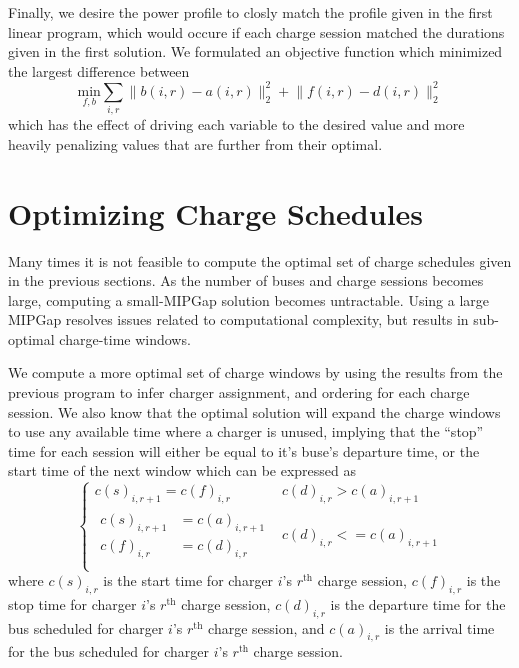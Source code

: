 \par Finally, we desire the power profile to closly match the profile given in the first linear program, which would occure if each charge session matched the durations given in the first solution. We formulated an objective function which minimized the largest difference between 
\begin{equation*}
	\underset{f,b}{\text{min}} \sum_{i,r}\lVert b(i,r) - a(i,r)\rVert_2^2 + \lVert f(i,r) - d(i,r) \rVert_2^2
\end{equation*}
which has the effect of driving each variable to the desired value and more heavily penalizing values that are further from their optimal.

\section{Optimizing Charge Schedules}
Many times it is not feasible to compute the optimal set of charge schedules given in the previous sections. As the number of buses and charge sessions becomes large, computing a small-MIPGap solution becomes untractable. Using a large MIPGap resolves issues related to computational complexity, but results in sub-optimal charge-time windows.
\par We compute a more optimal set of charge windows by using the results from the previous program to infer charger assignment, and ordering for each charge session. We also know that the optimal solution will expand the charge windows to use any available time where a charger is unused, implying that the ``stop'' time for each session will either be equal to it's buse's departure time, or the start time of the next window which can be expressed as
\begin{equation*}
\begin{cases}
	c(s)_{i,r+1} = c(f)_{i,r} & c(d)_{i,r} > c(a)_{i,r+1}\\[0.08in]
	\begin{aligned}
	c(s)_{i,r+1} &= c(a)_{i,r+1} \\
	c(f)_{i,r} &= c(d)_{i,r}
	\end{aligned} & c(d)_{i,r} <= c(a)_{i,r+1} \\
\end{cases}
\end{equation*}
where $c(s)_{i,r}$ is the start time for charger $i$'s $r^{\text{th}}$ charge session, $c(f)_{i,r}$ is the stop time for charger $i$'s $r^{\text{th}}$ charge session, $c(d)_{i,r}$ is the departure time for the bus scheduled for charger $i$'s $r^{\text{th}}$ charge session, and $c(a)_{i,r}$ is the arrival time for the bus scheduled for charger $i$'s $r^{\text{th}}$ charge session. 
